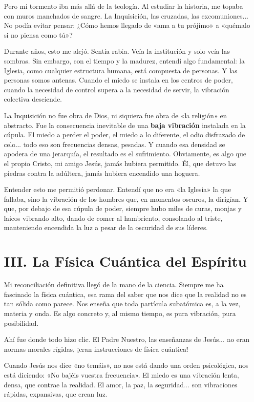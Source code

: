 Pero mi tormento iba más allá de la teología. Al estudiar la historia, me topaba con muros manchados de sangre. La Inquisición, las cruzadas, las excomuniones... No podía evitar pensar: ¿Cómo hemos llegado de «ama a tu prójimo» a «quémalo si no piensa como tú»?

Durante años, esto me alejó. Sentía rabia. Veía la institución y solo veía las sombras. Sin embargo, con el tiempo y la madurez, entendí algo fundamental: la Iglesia, como cualquier estructura humana, está compuesta de personas. Y las personas somos antenas. Cuando el miedo se instala en los centros de poder, cuando la necesidad de control supera a la necesidad de servir, la vibración colectiva desciende.

La Inquisición no fue obra de Dios, ni siquiera fue obra de «la religión» en abstracto. Fue la consecuencia inevitable de una \textbf{baja vibración} instalada en la cúpula. El miedo a perder el poder, el miedo a lo diferente, el odio disfrazado de celo... todo eso son frecuencias densas, pesadas. Y cuando esa densidad se apodera de una jerarquía, el resultado es el sufrimiento. Obviamente, es algo que el propio Cristo, mi amigo Jesús, jamás hubiera permitido. Él, que detuvo las piedras contra la adúltera, jamás hubiera encendido una hoguera.

Entender esto me permitió perdonar. Entendí que no era «la Iglesia» la que fallaba, sino la vibración de los hombres que, en momentos oscuros, la dirigían. Y que, por debajo de esa cúpula de poder, siempre hubo miles de curas, monjas y laicos vibrando alto, dando de comer al hambriento, consolando al triste, manteniendo encendida la luz a pesar de la oscuridad de sus líderes.

\section*{III. La Física Cuántica del Espíritu}

Mi reconciliación definitiva llegó de la mano de la ciencia. Siempre me ha fascinado la física cuántica, esa rama del saber que nos dice que la realidad no es tan sólida como parece. Nos enseña que toda partícula subatómica es, a la vez, materia y onda. Es algo concreto y, al mismo tiempo, es pura vibración, pura posibilidad.

Ahí fue donde todo hizo clic. El Padre Nuestro, las enseñanzas de Jesús... no eran normas morales rígidas, ¡eran instrucciones de física cuántica!

Cuando Jesús nos dice «no temáis», no nos está dando una orden psicológica, nos está diciendo: «No bajéis vuestra frecuencia». El miedo es una vibración lenta, densa, que contrae la realidad. El amor, la paz, la seguridad... son vibraciones rápidas, expansivas, que crean luz.


